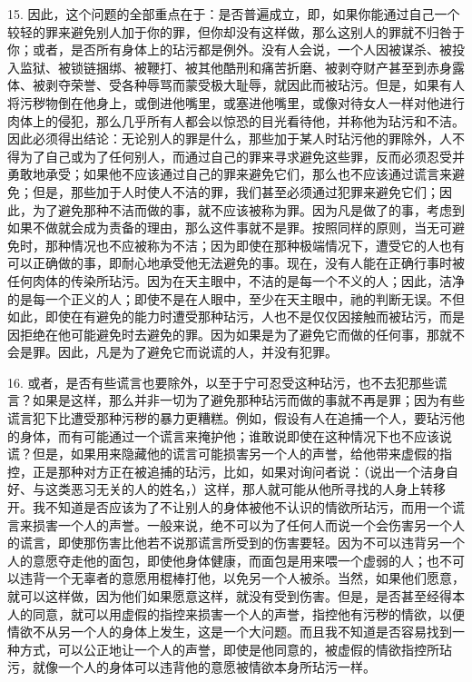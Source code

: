 15. 因此，这个问题的全部重点在于：是否普遍成立，即，如果你能通过自己一个较轻的罪来避免别人加于你的罪，但你却没有这样做，那么这别人的罪就不归咎于你；或者，是否所有身体上的玷污都是例外。没有人会说，一个人因被谋杀、被投入监狱、被锁链捆绑、被鞭打、被其他酷刑和痛苦折磨、被剥夺财产甚至到赤身露体、被剥夺荣誉、受各种辱骂而蒙受极大耻辱，就因此而被玷污。但是，如果有人将污秽物倒在他身上，或倒进他嘴里，或塞进他嘴里，或像对待女人一样对他进行肉体上的侵犯，那么几乎所有人都会以惊恐的目光看待他，并称他为玷污和不洁。因此必须得出结论：无论别人的罪是什么，那些加于某人时玷污他的罪除外，人不得为了自己或为了任何别人，而通过自己的罪来寻求避免这些罪，反而必须忍受并勇敢地承受；如果他不应该通过自己的罪来避免它们，那么也不应该通过谎言来避免；但是，那些加于人时使人不洁的罪，我们甚至必须通过犯罪来避免它们；因此，为了避免那种不洁而做的事，就不应该被称为罪。因为凡是做了的事，考虑到如果不做就会成为责备的理由，那么这件事就不是罪。按照同样的原则，当无可避免时，那种情况也不应被称为不洁；因为即使在那种极端情况下，遭受它的人也有可以正确做的事，即耐心地承受他无法避免的事。现在，没有人能在正确行事时被任何肉体的传染所玷污。因为在天主眼中，不洁的是每一个不义的人；因此，洁净的是每一个正义的人；即使不是在人眼中，至少在天主眼中，祂的判断无误。不但如此，即使在有避免的能力时遭受那种玷污，人也不是仅仅因接触而被玷污，而是因拒绝在他可能避免时去避免的罪。因为如果是为了避免它而做的任何事，那就不会是罪。因此，凡是为了避免它而说谎的人，并没有犯罪。\par

16. 或者，是否有些谎言也要除外，以至于宁可忍受这种玷污，也不去犯那些谎言？如果是这样，那么并非一切为了避免那种玷污而做的事就不再是罪；因为有些谎言犯下比遭受那种污秽的暴力更糟糕。例如，假设有人在追捕一个人，要玷污他的身体，而有可能通过一个谎言来掩护他；谁敢说即使在这种情况下也不应该说谎？但是，如果用来隐藏他的谎言可能损害另一个人的声誉，给他带来虚假的指控，正是那种对方正在被追捕的玷污，比如，如果对询问者说：（说出一个洁身自好、与这类恶习无关的人的姓名，）这样，那人就可能从他所寻找的人身上转移开。我不知道是否应该为了不让别人的身体被他不认识的情欲所玷污，而用一个谎言来损害一个人的声誉。一般来说，绝不可以为了任何人而说一个会伤害另一个人的谎言，即使那伤害比他若不说那谎言所受到的伤害要轻。因为不可以违背另一个人的意愿夺走他的面包，即使他身体健康，而面包是用来喂一个虚弱的人；也不可以违背一个无辜者的意愿用棍棒打他，以免另一个人被杀。当然，如果他们愿意，就可以这样做，因为他们如果愿意这样，就没有受到伤害。但是，是否甚至经得本人的同意，就可以用虚假的指控来损害一个人的声誉，指控他有污秽的情欲，以便情欲不从另一个人的身体上发生，这是一个大问题。而且我不知道是否容易找到一种方式，可以公正地让一个人的声誉，即使是他同意的，被虚假的情欲指控所玷污，就像一个人的身体可以违背他的意愿被情欲本身所玷污一样。\par

